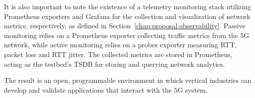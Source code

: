 It is also important to note the existence of a telemetry monitoring stack utilizing Prometheus exporters and Grafana for the collection and visualization of network metrics, respectively, as defined in Section~\ref{chap:proposal:observability}. Passive monitoring relies on a Prometheus exporter collecting traffic metrics from the \acs{5G} network, while active monitoring relies on a prober exporter measuring \acs{RTT}, packet loss and \acs{RTT} jitter. The collected metrics are stored in Prometheus, acting as the testbed's \acs{TSDB} for storing and querying network analytics. 

The result is an open, programmable environment in which vertical industries can develop and validate applications that interact with the \acs{5G} system.
